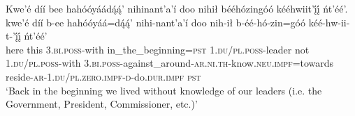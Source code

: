 \ea\label{ex:text7-1-1}
Kwe’é díí bee hahóóyáádą́ą́’ nihinant’a’í doo nihił bééhózingóó kééhwiit’į́į́ ńt’éé’.\\
\gll kwe’é	díí	b-ee	hahóóyáá=dą́ą́’	nihi-nant’a’í	doo	nih-ił	b-éé-hó-zin=góó	kéé-hw-ii-t-’į́į́	ńt’éé’\\
     here	this	3.\textsc{bi}.\textsc{poss}-with	in\_the\_beginning=\textsc{pst}	1.\textsc{du}/\textsc{pl}.\textsc{poss}-leader	not	1.\textsc{du}/\textsc{pl}.\textsc{poss}-with	3.\textsc{bi}.\textsc{poss}-against\_around-\textsc{ar}.\textsc{ni}.\textsc{th}-know.\textsc{neu}.\textsc{impf}=towards	reside-\textsc{ar}-1.\textsc{du}/\textsc{pl}.\textsc{zero}.\textsc{impf}-\textsc{d}-do.\textsc{dur}.\textsc{impf}	\textsc{pst}\\
\glt `Back in the beginning we lived without knowledge of our leaders (i.e. the Government, President, Commissioner, etc.)'
\z

